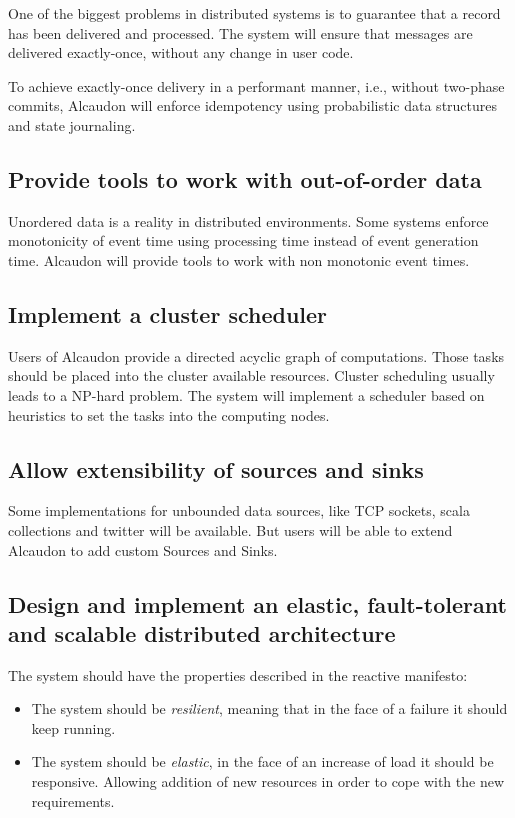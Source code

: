 One of the biggest problems in distributed systems is to guarantee that a record
has been delivered and processed. The system will ensure that messages are
delivered exactly-once, without any change in user code.

To achieve exactly-once delivery in a performant manner, i.e., without two-phase
commits\cite{twophase}, Alcaudon will enforce idempotency using probabilistic
data structures and state journaling.

\subsection{Provide tools to work with out-of-order data}

Unordered data is a reality in distributed environments. Some systems enforce
monotonicity of event time using processing time instead of event
generation time. Alcaudon will provide tools to work with non monotonic event
times.

\subsection{Implement a cluster scheduler}

Users of Alcaudon provide a directed acyclic graph of computations. Those
tasks should be placed into the cluster available resources. Cluster scheduling
usually leads to a NP-hard problem. The system will implement a scheduler based
on heuristics to set the tasks into the computing nodes.


\subsection{Allow extensibility of sources and sinks}
Some implementations for unbounded data sources, like TCP sockets, scala collections
and twitter will be available. But users will be able to extend Alcaudon to add
custom Sources and Sinks.

\subsection{Design and implement an elastic, fault-tolerant and scalable distributed architecture}
The system should have the properties described in the reactive manifesto\cite{reactivemanifesto}:

\begin{itemize}
  \item The system should be \textit{resilient}, meaning that in the face of a failure it should keep running.
  \item The system should be \textit{elastic}, in the face of an increase of load it
    should be responsive. Allowing addition of new resources in order to cope
    with the new requirements.
\end{itemize}

